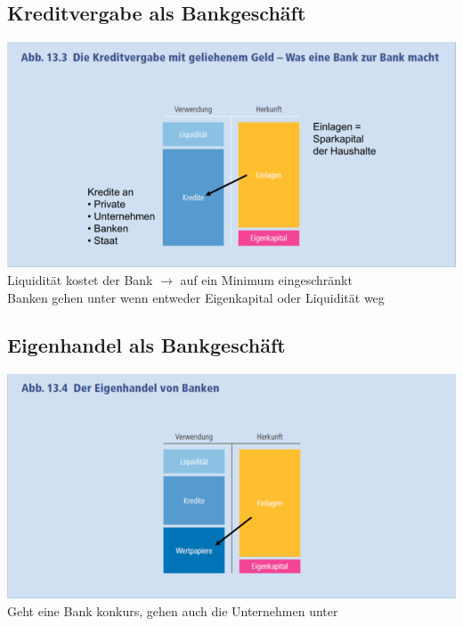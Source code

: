 \begin{multicols}{2}
	\subsection{Kreditvergabe als Bankgeschäft}
	\includegraphics[width=\linewidth]{images/kreditvergabe.png}
	Liquidität kostet der Bank $\rightarrow$ auf ein Minimum eingeschränkt\\
	Banken gehen unter wenn entweder Eigenkapital oder Liquidität weg
	\columnbreak
	\subsection{Eigenhandel als Bankgeschäft}
	\includegraphics[width=\linewidth]{images/eigenhandel.png}
	Geht eine Bank konkurs, gehen auch die Unternehmen unter
\end{multicols}

